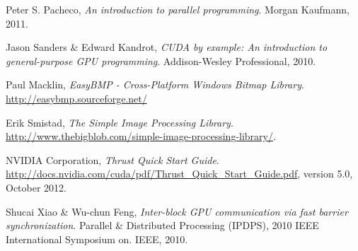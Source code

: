 \begin{thebibliography}{99}
	Peter S. Pacheco,
	\emph{An introduction to parallel programming}.
	Morgan Kaufmann,
	2011.

	Jason Sanders \& Edward Kandrot,
	\emph{CUDA by example: An introduction to general-purpose GPU programming}.
	Addison-Wesley Professional,
	2010.

	Paul Macklin,
	\emph{EasyBMP - Cross-Platform Windows Bitmap Library}.
	\url{http://easybmp.sourceforge.net/}

	Erik Smistad,
	\emph{The Simple Image Processing Library}.
	\url{http://www.thebigblob.com/simple-image-processing-library/}.
	
	NVIDIA Corporation,
	\emph{Thrust Quick Start Guide}.
	\url{http://docs.nvidia.com/cuda/pdf/Thrust_Quick_Start_Guide.pdf},
	version 5.0, October 2012.

	
	Shucai Xiao \& Wu-chun Feng,
	\emph{Inter-block GPU communication via fast barrier synchronization}.
	Parallel \& Distributed Processing (IPDPS), 2010 IEEE International Symposium on. IEEE,
	2010.
	
	

\end{thebibliography}
